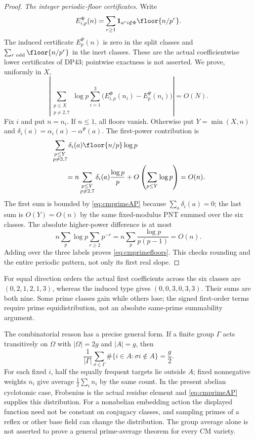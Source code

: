 \begin{proof}
\emph{The integer periodic-floor certificates.}
Write
\[
 E_{i,p}^\Phi(n)
       =\sum_{r\ge1}\mathbf1_{a^ri\notin\Phi}
          \floor{n/p^r}.
\]
The induced certificate $E_p^\Psi(n)$ is zero in the split classes and
$\sum_{r\text{ odd}}\floor{n/p^r}$ in the inert classes.
These are the actual coefficientwise lower certificates of DP43; pointwise exactness is not asserted.
We prove, uniformly in $X$,
\begin{equation}\label{eq:cmprimefloors}
 \left|\sum_{\substack{p\le X\\p\ne2,7}}\log p
       \sum_{i=1}^3\bigl(E_{i,p}^\Phi(n_i)-E_p^\Psi(n_i)\bigr)\right|
       =O(N).
\end{equation}
Fix $i$ and put $n=n_i$. If $n\le1$, all floors vanish.
Otherwise put $Y=\min(X,n)$ and $\delta_i(a)=\alpha_i(a)-\alpha^\Psi(a)$.
The first-power contribution is
\begin{align*}
 &\sum_{\substack{p\le Y\\p\ne2,7}}
       \delta_i(a)\floor{n/p}\log p\\
 &\qquad=n\sum_{\substack{p\le Y\\p\ne2,7}}
       \delta_i(a)\frac{\log p}{p}
       +O\left(\sum_{p\le Y}\log p\right)=O(n).
\end{align*}
The first sum is bounded by \eqref{eq:cmprimeAP} because $\sum_a\delta_i(a)=0$; the last sum is $O(Y)=O(n)$ by the same fixed-modulus PNT summed over the six classes.
The absolute higher-power difference is at most
\[
 n\sum_p\log p\sum_{r\ge2}p^{-r}
       =n\sum_p\frac{\log p}{p(p-1)}=O(n).
\]
Adding over the three labels proves \eqref{eq:cmprimefloors}.
This checks rounding and the entire periodic pattern, not only its first real slope.
\end{proof}

For equal direction orders the actual first coefficients across the six classes are $(0,2,1,2,1,3)$, whereas the induced type gives $(0,0,3,0,3,3)$. Their sums are both nine. Some prime classes gain while others lose; the signed first-order terms require prime equidistribution, not an absolute same-prime summability argument.

The combinatorial reason has a precise general form. If a finite group $\Gamma$ acts transitively on $\Omega$ with $|\Omega|=2g$ and $|A|=g$, then
\[
 \frac1{|\Gamma|}\sum_{\sigma\in\Gamma}
       \#\{i\in A:\sigma i\notin A\}=\frac g2.
\]
For each fixed $i$, half the equally frequent targets lie outside $A$; fixed nonnegative weights $n_i$ give average $\tfrac12\sum_i n_i$ by the same count.
In the present abelian cyclotomic case, Frobenius is the actual residue element and \eqref{eq:cmprimeAP} supplies this distribution. For a nonabelian embedding action the displayed function need not be constant on conjugacy classes, and sampling primes of a reflex or other base field can change the distribution. The group average alone is not asserted to prove a general prime-average theorem for every CM variety.

